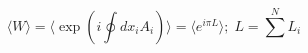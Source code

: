 \begin{equation}
\label{link}
\langle W\rangle =\langle \exp (i\oint dx_iA_i)\rangle =\langle e^{i\pi L}\rangle ;\;L=\sum^N L_i
\end{equation} 

